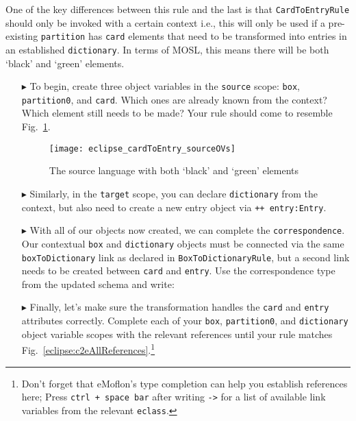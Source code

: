 One of the key differences between this rule and the last is that \texttt{Card\-To\-Ent\-ry\-Rule} should only be invoked with a certain context i.e., this will
only be used if a pre-existing \texttt{partition} has \texttt{card} elements that need to be transformed into entries in an established \texttt{dictionary}. In
terms of MOSL, this means there will be both `black' and `green' elements.

\begin{itemize}

\item[$\blacktriangleright$] To begin, create three object variables in the \texttt{source} scope: \texttt{box}, \texttt{partition0}, and \texttt{card}. Which
ones are already known from the context? Which element still needs to be made? Your rule should come to resemble Fig.~\ref{eclipse:c2eRuleSource}.

\begin{figure}[htbp]
\begin{center}
  \texttt{[image: eclipse\_cardToEntry\_sourceOVs]}
  \caption{The source language with both `black' and `green' elements}
  \label{eclipse:c2eRuleSource}
\end{center}
\end{figure}

\item[$\blacktriangleright$] Similarly, in the \texttt{target} scope, you can declare \texttt{dictionary} from the context, but also need to create a new
entry object via \texttt{++ entry:Entry}. 

\vspace{0.5cm}

\item[$\blacktriangleright$] With all of our objects now created, we can complete the \texttt{cor\-res\-pon\-dence}. Our contextual \texttt{box} and
\texttt{dictionary} objects must be connected via the same \texttt{boxToDictionary} link as declared in \texttt{Box\-To\-Dict\-ion\-ary\-Rule}, but a second
link needs to be created between \texttt{card} and \texttt{entry}. Use the correspondence type from the updated schema and write: 

\vspace{0.5cm}

\item[$\blacktriangleright$] Finally, let's make sure the transformation handles the \texttt{card} and \texttt{entry} attributes correctly. Complete each of
your \texttt{box}, \texttt{partition0}, and \texttt{dictionary} object variable scopes with the relevant references until your rule matches
Fig.~\ref{eclipse:c2eAllReferences}.\footnote{Don't forget that eMoflon's type completion can help you establish references here; Press \texttt{ctrl + space
bar} after writing \texttt{->} for a list of available link variables from the relevant \texttt{eclass}.}


\end{itemize}
